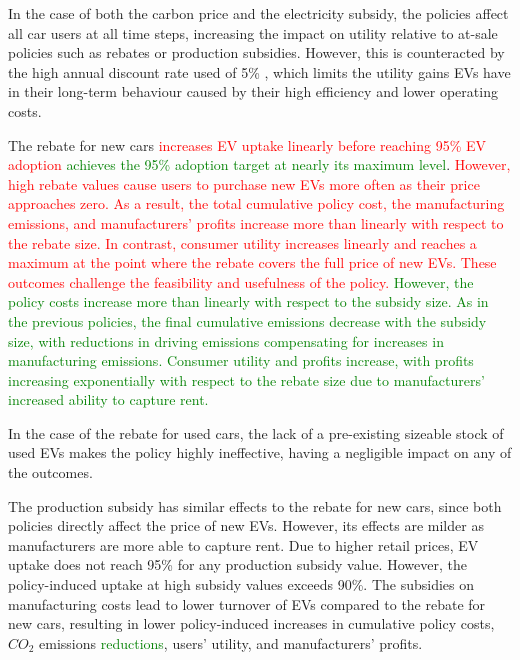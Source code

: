 \documentclass[12pt]{article}
\begin{document}
	In the case of both the carbon price and the electricity subsidy, the policies affect all car users at all time steps, increasing the impact on utility relative to at-sale policies such as rebates or production subsidies. However, this is counteracted by the high annual discount rate used of 5\% \citep{busse2013consumers, greene2010consumers}, which limits the utility gains EVs have in their long-term behaviour caused by their high efficiency and lower operating costs. 
	
	The rebate for new cars \textcolor{red}{increases EV uptake linearly before reaching 95\% EV adoption} \textcolor{green}{achieves the 95\% adoption target at nearly its maximum level}. \textcolor{red}{However, high rebate values cause users to purchase new EVs more often as their price approaches zero. As a result, the total cumulative policy cost, the manufacturing emissions, and manufacturers' profits increase more than linearly with respect to the rebate size. In contrast, consumer utility increases linearly and reaches a maximum at the point where the rebate covers the full price of new EVs. These outcomes challenge the feasibility and usefulness of the policy.} \textcolor{green}{However, the policy costs increase more than linearly with respect to the subsidy size. As in the previous policies, the final cumulative emissions decrease with the subsidy size, with reductions in driving emissions compensating for increases in manufacturing emissions. Consumer utility and profits increase, with profits increasing exponentially with respect to the rebate size due to manufacturers' increased ability to capture rent.}
	
	In the case of the rebate for used cars, the lack of a pre-existing sizeable stock of used EVs makes the policy highly ineffective, having a negligible impact on any of the outcomes. 
	
	The production subsidy has similar effects to the rebate for new cars, since both policies directly affect the price of new EVs. However, its effects are milder as manufacturers are more able to capture rent. Due to higher retail prices, EV uptake does not reach 95\% for any production subsidy value. However, the policy-induced uptake at high subsidy values exceeds 90\%. The subsidies on manufacturing costs lead to lower turnover of EVs compared to the rebate for new cars, resulting in lower policy-induced increases in cumulative policy costs, $CO_2$ emissions \textcolor{green}{reductions}, users' utility, and manufacturers' profits.
	
\end{document}

